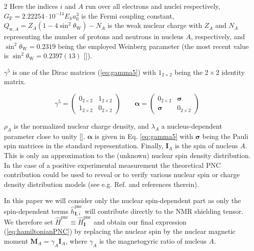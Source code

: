 \documentclass[a4paper,12pt,english]{article}
\begin{document}
\begin{spacing}{2}
\noindent Here the indices $i$ and $A$ run over all electrons and nuclei respectively, $G_\text{F} = 2.22254\cdot 10^{-14}E_ha_0^3$ is the Fermi coupling constant, \mbox{$Q_{\text{w},A} = Z_A(1-4\sin^2\theta_\text{W})-N_A$} is the weak nuclear charge with $Z_A$ and $N_A$ representing the number of protons and neutrons in nucleus $A$, respectively, and $\sin^2\theta_\text{W} = 0.2319$ being the employed Weinberg parameter (the most recent value is $\sin^2\theta_\text{W} = 0.2397(13)$ [\cite{anthony2005physrevlett}]).

\noindent $\gamma^5$ is one of the Dirac matrices (\ref{eq:gamma5}) with $1_{2\times 2}$ being the $2\times 2$ identity matrix.

\begin{equation}\label{eq:gamma5}
  \gamma^5 = \begin{pmatrix}0_{2\times 2}&1_{2\times 2}\\1_{2\times 2}&0_{2\times 2}\end{pmatrix} \qquad \boldsymbol{\alpha} = \begin{pmatrix}0_{2\times 2}&\boldsymbol{\sigma}\\\boldsymbol{\sigma}&0_{2\times 2}\end{pmatrix}
\end{equation}

\noindent $\rho_A$ is the normalized nuclear charge density, and $\lambda_A$ a nucleus-dependent parameter close to unity [\cite{cahn1977physlettb,marciano1978physrevd,berger}]. $\boldsymbol{\alpha}$ is given in Eq. \ref{eq:gamma5} with $\boldsymbol{\sigma}$ being the Pauli spin matrices in the standard representation. Finally, $\mathbf{I}_A$ is the spin of nucleus $A$. This is only an approximation to the (unknown) nuclear spin density distribution. In the case of a positive experimental measurement the theoretical PNC contribution could be used to reveal or to verify various nuclear spin or charge density distribution models (see e.g. Ref. \cite{mukhamedjanov:solidpnc} and references therein).

\par In this paper we will consider only the nuclear spin-dependent part as only the spin-dependent terms $\hat{h}^\text{pnc}_{\mathbf{I},i}$ will contribute directly to the NMR shielding tensor. We therefore set $\hat{H}^\text{pnc} \equiv \hat{H}^\text{pnc}_\mathbf{I}$ and obtain our final expression (\ref{eq:hamiltonianPNC}) by replacing the nuclear spin by the nuclear magnetic moment $\mathbf{M}_A = \gamma_A\mathbf{I}_A$, where $\gamma_A$ is the magnetogyric ratio of nucleus $A$.


\end{spacing}
\end{document}
